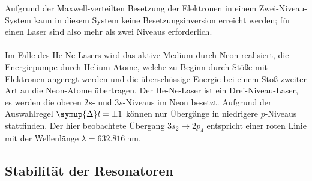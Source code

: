     Aufgrund der Maxwell-verteilten Besetzung der Elektronen in einem Zwei-Niveau-System kann in diesem System keine Besetzungsinversion erreicht werden;
    für einen Laser sind also mehr als zwei Niveaus erforderlich.\\
    \\
    Im Falle des He-Ne-Lasers wird das aktive Medium durch Neon realisiert,
    die Energiepumpe durch Helium-Atome,
    welche zu Beginn durch Stöße mit Elektronen angeregt werden und die überschüssige Energie bei einem Stoß zweiter Art an die Neon-Atome übertragen.
    Der He-Ne-Laser ist ein Drei-Niveau-Laser,
    es werden die oberen $2s$- und $3s$-Niveaus im Neon besetzt.
    Aufgrund der Auswahlregel $\symup{\Delta} l = \pm 1$ können nur Übergänge in niedrigere $p$-Niveaus stattfinden.
    Der hier beobachtete Übergang $3s_2 \to 2p_4$ entspricht einer roten Linie mit der Wellenlänge $\lambda = \SI{632.816}{\nano\meter}$.

\subsection{Stabilität der Resonatoren}
\label{sec:stabilitaet}

